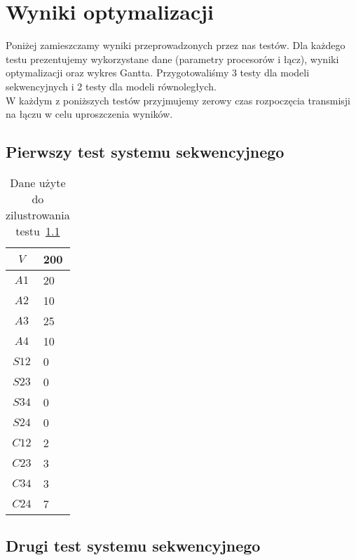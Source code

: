 
\section{Wyniki optymalizacji}

Poniżej zamieszczamy wyniki przeprowadzonych przez nas testów.
Dla każdego testu prezentujemy wykorzystane dane (parametry procesorów i łącz),
wyniki optymalizacji oraz wykres Gantta.
Przygotowaliśmy 3 testy dla modeli sekwencyjnych i 2 testy dla modeli równoległych. \\

W każdym z poniższych testów przyjmujemy zerowy czas rozpoczęcia transmisji na łączu w celu uproszczenia wyników.

\subsection{Pierwszy test systemu sekwencyjnego} \label{test1}

\begin{table}[H]
\centering
\begin{tabular}{|c|l|}
\hline
$V$ & 200 \\ \hline
$A1$ & 20 \\ \hline
$A2$ & 10 \\ \hline
$A3$ & 25 \\ \hline
$A4$ & 10 \\ \hline
$S12$ & 0 \\ \hline
$S23$ & 0 \\ \hline
$S34$ & 0 \\ \hline
$S24$ & 0 \\ \hline
$C12$ & 2 \\ \hline
$C23$ & 3 \\ \hline
$C34$ & 3 \\ \hline
$C24$ & 7 \\ \hline
\end{tabular}
\caption{Dane użyte do zilustrowania testu~\ref{test1}}
\label{tab:res_1}
\end{table}

\subsection{Drugi test systemu sekwencyjnego} \label{test2}

